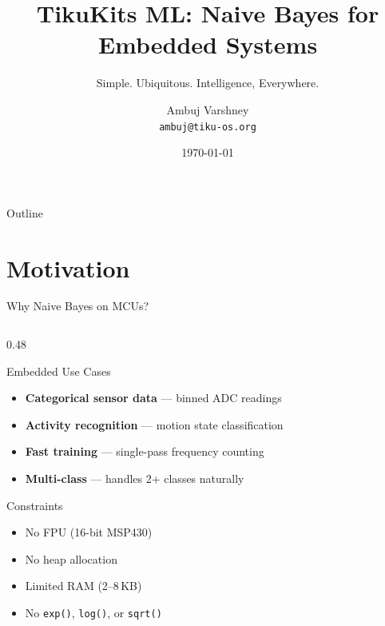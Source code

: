 \documentclass[aspectratio=169, 10pt]{beamer}
\title[TikuKits ML]{TikuKits ML: Naive Bayes for Embedded Systems}
\subtitle{Simple. Ubiquitous. Intelligence, Everywhere.}
\author[Ambuj Varshney]{Ambuj Varshney \\ \texttt{ambuj@tiku-os.org}}
\date{\today}
\begin{document}
\begin{frame}
\titlepage
\end{frame}

\begin{frame}{Outline}
\tableofcontents
\end{frame}

\section{Motivation}

\begin{frame}{Why Naive Bayes on MCUs?}
\begin{columns}[T]
\begin{column}{0.48\textwidth}
\begin{block}{Embedded Use Cases}
\begin{itemize}
  \item \textbf{Categorical sensor data} --- binned ADC readings
  \item \textbf{Activity recognition} --- motion state classification
  \item \textbf{Fast training} --- single-pass frequency counting
  \item \textbf{Multi-class} --- handles 2+ classes naturally
\end{itemize}
\end{block}

\begin{block}{Constraints}
\begin{itemize}
  \item No FPU (16-bit MSP430)
  \item No heap allocation
  \item Limited RAM (2--8\,KB)
  \item No \texttt{exp()}, \texttt{log()}, or \texttt{sqrt()}
\end{itemize}
\end{block}
\end{column}


\end{columns}
\end{frame}
\end{document}
